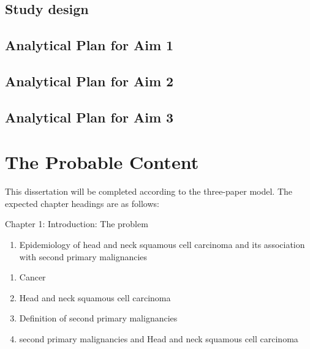 \documentclass[12pt]{book}
\numberwithin{equation}{chapter}
\providecommand{\tightlist}{%
  \setlength{\itemsep}{0pt}\setlength{\parskip}{0pt}}
\begin{document}
\hypertarget{study-design}{%
\section{Study design}\label{study-design}}

\hypertarget{analytical-plan-for-aim-1}{%
\section{Analytical Plan for Aim 1}\label{analytical-plan-for-aim-1}}

\hypertarget{analytical-plan-for-aim-2}{%
\section{Analytical Plan for Aim 2}\label{analytical-plan-for-aim-2}}

\hypertarget{analytical-plan-for-aim-3}{%
\section{Analytical Plan for Aim 3}\label{analytical-plan-for-aim-3}}

\hypertarget{the-probable-content}{%
\chapter{The Probable Content}\label{the-probable-content}}

This dissertation will be completed according to the three-paper model. The expected chapter headings are as follows:

Chapter 1: Introduction: The problem

\begin{enumerate}
\def\labelenumi{\Alph{enumi}.}
\tightlist
\item
  Epidemiology of head and neck squamous cell carcinoma and its association with second primary malignancies
\end{enumerate}

\begin{enumerate}
\def\labelenumi{\arabic{enumi}.}
\tightlist
\item
  Cancer
\item
  Head and neck squamous cell carcinoma
\item
  Definition of second primary malignancies
\item
  second primary malignancies and Head and neck squamous cell carcinoma
\end{enumerate}
\end{document}
